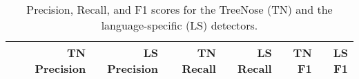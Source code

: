 
\begin{table*}[t]
    \centering
    \caption{
        \label{tab:annotation_table}
        Precision, Recall, and F1 scores for the TreeNose (TN) and the language-specific (LS) detectors.
    }
    \renewcommand{\arraystretch}{1.2}
    \begin{tabular}{@{}lrrrrrr@{}}
        \toprule
            {\bf }
            &
            {\bf TN Precision}
            &
            {\bf LS Precision}
            &
            {\bf TN Recall}
            &
            {\bf LS Recall}
            &
            {\bf TN F1}
            &
            {\bf LS F1}
            \\
        \bottomrule
        

    \end{tabular}
    \vspace{-1em}
\end{table*}
